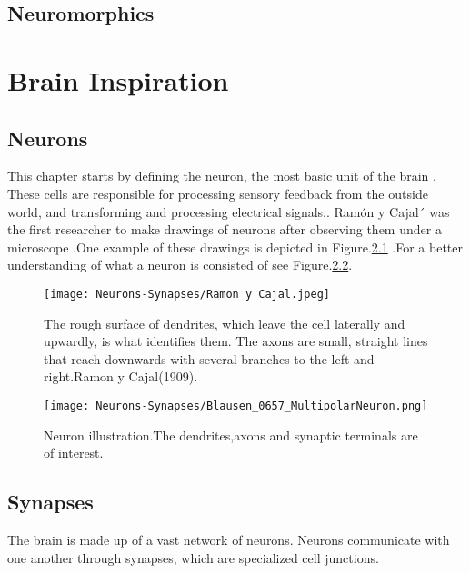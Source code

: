 \documentclass{report}
\begin{document}
\section{Neuromorphics}
\chapter{Brain Inspiration}
\section{Neurons}
This chapter starts by defining the neuron, the most basic unit of the brain \cite{gerstner2014}. These cells are responsible for processing sensory feedback from the outside world, and transforming and processing electrical signals.\cite{balduzzi2013}. Ramón y Cajal´ was the first researcher to make drawings of neurons after observing them under a microscope\cite{garcialopezp2010}
.One example of these drawings is depicted in Figure.\ref{fig:neurons-ramoncajal} .For a better understanding of what a neuron is consisted of see Figure.\ref{fig:neurons-multipolar}.
\begin{figure}[htp]
    \centering
    \texttt{[image: Neurons-Synapses/Ramon y Cajal.jpeg]}
    \caption{The rough surface of dendrites, which leave the cell laterally and upwardly, is what identifies them. The axons are small, straight lines that reach downwards with several branches to the left and right.Ramon y Cajal(1909).}
    \label{fig:neurons-ramoncajal}
\end{figure}
\begin{figure}[htp]
    \centering
    \texttt{[image: Neurons-Synapses/Blausen\_0657\_MultipolarNeuron.png]}
    \caption{Neuron illustration.The dendrites,axons and synaptic terminals are of interest.}
    \label{fig:neurons-multipolar}
\end{figure}
\section{Synapses}
The brain is made up of a vast network of neurons. Neurons communicate with one another through synapses, which are specialized cell junctions.\cite{li2003}


\end{document}
